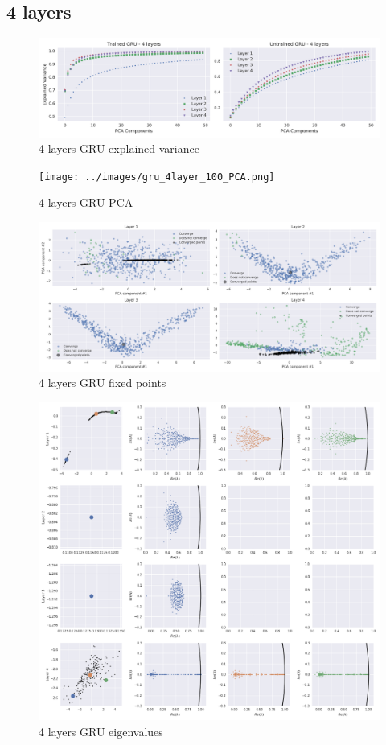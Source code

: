 \documentclass{article}
\begin{document}
\subsection{4 layers}
\label{anx:4-layers}
\begin{figure}[H]
  \centering
  \includegraphics[width=\textwidth]{../images/gru_4layer_100_explained_variance.png}
  \caption{4 layers GRU explained variance}
  \label{fig:-images-gru_4layer_explained_variance-png}
\end{figure}
\begin{figure}[H]
  \centering
  \texttt{[image: ../images/gru\_4layer\_100\_PCA.png]}
  \caption{4 layers GRU PCA}
  \label{fig:-images-gru_4layer_PCA-png}
\end{figure}
\begin{figure}[H]
  \centering
  \includegraphics[width=\textwidth]{../images/gru_4layer_100_fixed_points.png}
  \caption{4 layers GRU fixed points}
  \label{fig:-images-gru_4layer_fixed_points-png}
\end{figure}
\begin{figure}[H]
  \centering
  \includegraphics[width=\textwidth]{../images/gru_4layer_100_eig.png}
  \caption{4 layers GRU eigenvalues}
  \label{fig:-images-gru_4layer_eig-png}
\end{figure}
\small




\end{document}
